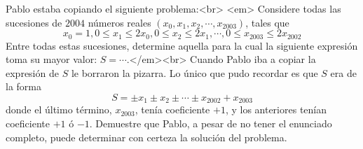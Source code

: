 Pablo estaba copiando el siguiente problema:<br>
<em> Considere todas las sucesiones de $2004$ números reales $(x_0, x_1, x_2, \cdots , x_{2003})$, tales que
\[ x_0 = 1, 0 \leq x_1 \leq 2x_0, 0 \leq x_2 \leq 2x_1, \cdots , 0 \leq x_{2003} \leq 2x_{2002} \]
Entre todas estas sucesiones, determine aquella para la cual la siguiente expresión toma su mayor valor: $S=\cdots$.</em><br>
Cuando Pablo iba a copiar la expresión de $S$ le borraron la pizarra. Lo único que pudo recordar es que $S$ era de la forma
\[ S= \pm x_1 \pm x_2 \pm \cdots \pm x_{2002} + x_{2003} \]
donde el último término, $x_{2003}$, tenía coeficiente $+1$, y los anteriores tenían coeficiente $+1$ ó $-1$. Demuestre que Pablo, a pesar de no tener el enunciado completo, puede determinar con certeza la solución del problema.
